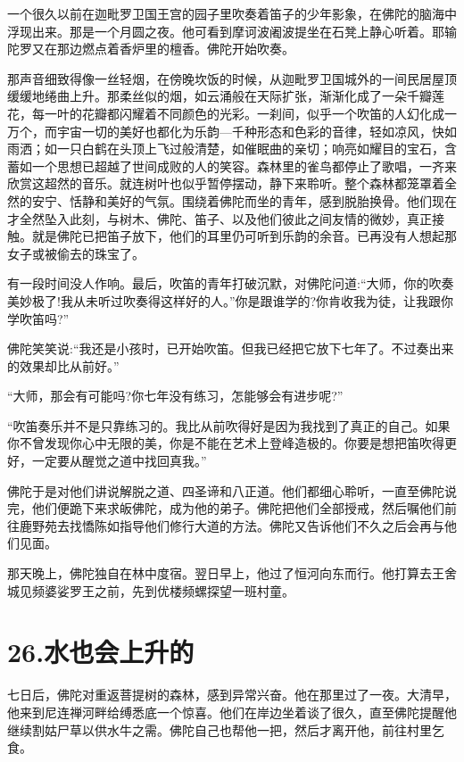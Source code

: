 \documentclass[12pt,twoside,openany]{book}
\begin{document}
一个很久以前在迦毗罗卫国王宫的园子里吹奏着笛子的少年影象，在佛陀的脑海中浮现出来。那是一个月圆之夜。他可看到摩诃波阇波提坐在石凳上静心听着。耶输陀罗又在那边燃点着香炉里的檀香。佛陀开始吹奏。

那声音细致得像一丝轻烟，在傍晚坎饭的时候，从迦毗罗卫国城外的一间民居屋顶缓缓地绻曲上升。那柔丝似的烟，如云涌般在天际扩张，渐渐化成了一朵千瓣莲花，每一叶的花瓣都闪耀着不同颜色的光彩。一刹间，似乎一个吹笛的人幻化成一万个，而宇宙一切的美好也都化为乐韵—千种形态和色彩的音律，轻如凉风，快如雨洒；如一只白鹤在头顶上飞过般清楚，如催眠曲的亲切；响亮如耀目的宝石，含蓄如一个思想已超越了世间成败的人的笑容。森林里的雀鸟都停止了歌唱，一齐来欣赏这超然的音乐。就连树叶也似乎暂停摆动，静下来聆听。整个森林都笼罩着全然的安宁、恬静和美好的气氛。围绕着佛陀而坐的青年，感到脱胎换骨。他们现在才全然坠入此刻，与树木、佛陀、笛子、以及他们彼此之间友情的微妙，真正接触。就是佛陀已把笛子放下，他们的耳里仍可听到乐韵的余音。已再没有人想起那女子或被偷去的珠宝了。

有一段时间没人作响。最后，吹笛的青年打破沉默，对佛陀问道:“大师，你的吹奏美妙极了!我从未听过吹奏得这样好的人。”你是跟谁学的?你肯收我为徒，让我跟你学吹笛吗?”

佛陀笑笑说:“我还是小孩时，已开始吹笛。但我已经把它放下七年了。不过奏出来的效果却比从前好。”

“大师，那会有可能吗?你七年没有练习，怎能够会有进步呢?”

“吹笛奏乐并不是只靠练习的。我比从前吹得好是因为我找到了真正的自己。如果你不曾发现你心中无限的美，你是不能在艺术上登峰造极的。你要是想把笛吹得更好，一定要从醒觉之道中找回真我。”

佛陀于是对他们讲说解脱之道、四圣谛和八正道。他们都细心聆听，一直至佛陀说完，他们便跪下来求皈佛陀，成为他的弟子。佛陀把他们全部授戒，然后嘱他们前往鹿野苑去找憍陈如指导他们修行大道的方法。佛陀又告诉他们不久之后会再与他们见面。

那天晚上，佛陀独自在林中度宿。翌日早上，他过了恒河向东而行。他打算去王舍城见频婆娑罗王之前，先到优楼频螺探望一班村童。


\chapter{26.水也会上升的}\label{ch26}

七日后，佛陀对重返菩提树的森林，感到异常兴奋。他在那里过了一夜。大清早，他来到尼连禅河畔给缚悉底一个惊喜。他们在岸边坐着谈了很久，直至佛陀提醒他继续割姑尸草以供水牛之需。佛陀自己也帮他一把，然后才离开他，前往村里乞食。
\end{document}
